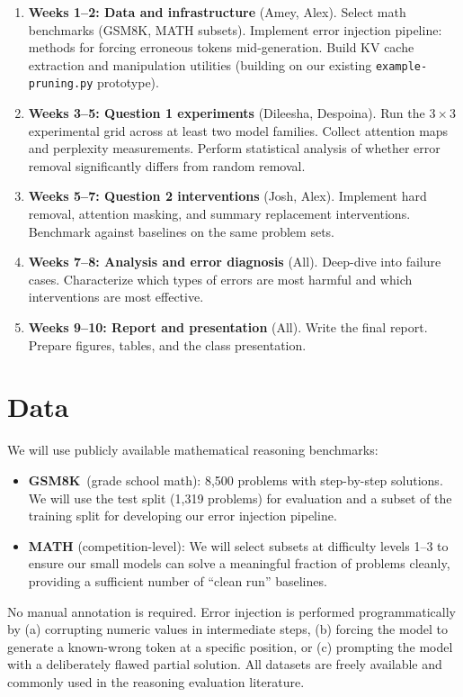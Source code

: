 \documentclass[11pt,a4paper]{article}
\begin{document}
\begin{enumerate}
    \item \textbf{Weeks 1--2: Data and infrastructure} (Amey, Alex). Select math benchmarks (GSM8K, MATH subsets). Implement error injection pipeline: methods for forcing erroneous tokens mid-generation. Build KV cache extraction and manipulation utilities (building on our existing \texttt{example-pruning.py} prototype).
    \item \textbf{Weeks 3--5: Question 1 experiments} (Dileesha, Despoina). Run the $3 \times 3$ experimental grid across at least two model families. Collect attention maps and perplexity measurements. Perform statistical analysis of whether error removal significantly differs from random removal.
    \item \textbf{Weeks 5--7: Question 2 interventions} (Josh, Alex). Implement hard removal, attention masking, and summary replacement interventions. Benchmark against baselines on the same problem sets.
    \item \textbf{Weeks 7--8: Analysis and error diagnosis} (All). Deep-dive into failure cases. Characterize which types of errors are most harmful and which interventions are most effective.
    \item \textbf{Weeks 9--10: Report and presentation} (All). Write the final report. Prepare figures, tables, and the class presentation.
\end{enumerate}

\section{Data}

We will use publicly available mathematical reasoning benchmarks:

\begin{itemize}
    \item \textbf{GSM8K}~(grade school math): 8,500 problems with step-by-step solutions. We will use the test split (1,319 problems) for evaluation and a subset of the training split for developing our error injection pipeline.
    \item \textbf{MATH} (competition-level): We will select subsets at difficulty levels 1--3 to ensure our small models can solve a meaningful fraction of problems cleanly, providing a sufficient number of ``clean run'' baselines.
\end{itemize}

No manual annotation is required.
Error injection is performed programmatically by (a) corrupting numeric values in intermediate steps, (b) forcing the model to generate a known-wrong token at a specific position, or (c) prompting the model with a deliberately flawed partial solution.
All datasets are freely available and commonly used in the reasoning evaluation literature.
\end{document}
